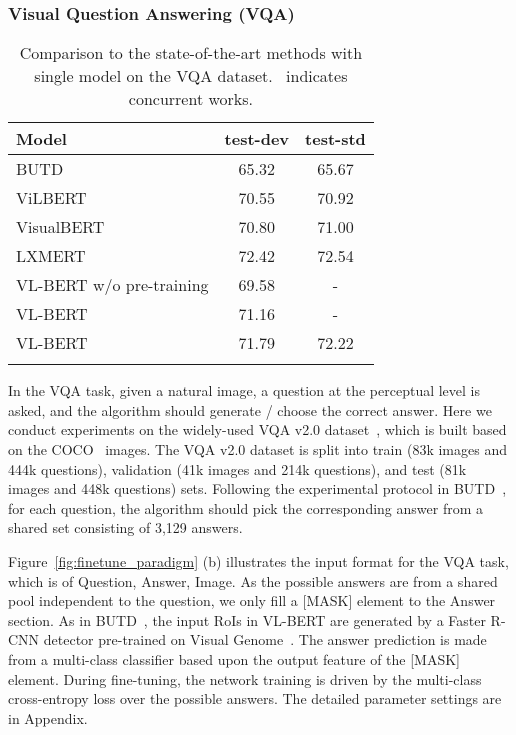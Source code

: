 \documentclass{article} \usepackage{iclr2020_conference,times}
\begin{document}
\subsubsection{Visual Question Answering (VQA)}

\begin{table}[ht]
\small
    \centering
\begin{tabular}{l|cc}
\Xhline{1.0pt}
     Model & test-dev & test-std\\
\hline
    BUTD~\citep{anderson2018bottom} & 65.32 & 65.67 \\
\hline
    ViLBERT~\citep{lu2019vilbert}  & 70.55 & 70.92 \\
    VisualBERT~\citep{li2019visualbert}  & 70.80 & 71.00  \\
    LXMERT~\citep{tan2019lxmert}  & 72.42 & 72.54  \\
\hline
    VL-BERT  w/o pre-training  & 69.58 & - \\
    VL-BERT   & 71.16 & -   \\
    VL-BERT   & 71.79 & 72.22  \\
\Xhline{1.0pt}
\end{tabular}
\caption{Comparison to the state-of-the-art methods with single model on the VQA dataset. \newline \dag ~indicates concurrent works.}
\label{table:results_VQA}
\end{table}

In the VQA task, given a natural image, a question at the perceptual level is asked, and the algorithm should generate / choose the correct answer. Here we conduct experiments on the widely-used VQA v2.0 dataset~\citep{goyal2017making}, which is built based on the COCO~\citep{lin2014microsoft} images. The VQA v2.0 dataset is split into train (83k images and 444k questions), validation (41k images and 214k questions), and test (81k images and 448k questions) sets. Following the experimental protocol in BUTD~\citep{anderson2018bottom}, for each question, the algorithm should pick the corresponding answer from a shared set consisting of 3,129 answers.


Figure~\ref{fig:finetune_paradigm} (b) illustrates the input format for the VQA task, which is of Question, Answer, Image. As the possible answers are from a shared pool independent to the question, we only fill a [MASK] element to the Answer section. As in BUTD~\citep{anderson2018bottom}, the input RoIs in VL-BERT are generated by a Faster R-CNN detector pre-trained on Visual Genome~\citep{krishna2017visual}. The answer prediction is made from a multi-class classifier based upon the output feature of the [MASK] element. During fine-tuning, the network training is driven by the multi-class cross-entropy loss over the possible answers. The detailed parameter settings are in Appendix.
\end{document}
